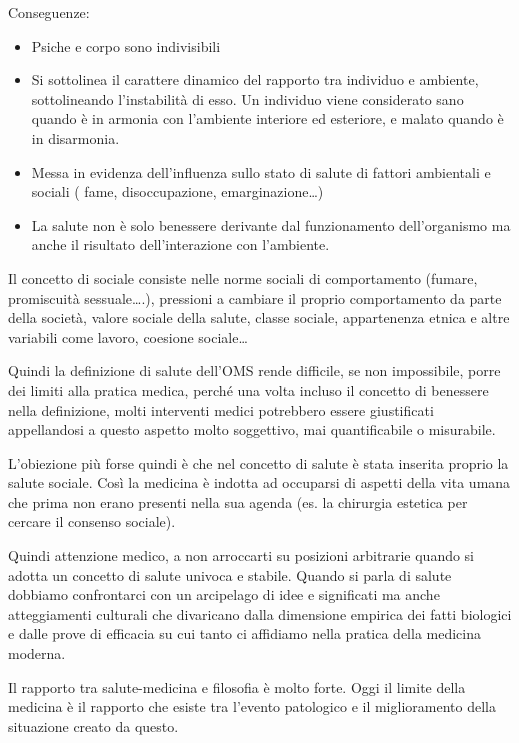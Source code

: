   Conseguenze:
\begin{itemize}
\item
  Psiche e corpo sono indivisibili
\item
  Si sottolinea il carattere dinamico del rapporto tra individuo e
  ambiente, sottolineando l'instabilità di esso. Un individuo viene
  considerato sano quando è in armonia con l'ambiente interiore ed
  esteriore, e malato quando è in disarmonia.
\item
  Messa in evidenza dell'influenza sullo stato di salute di fattori
  ambientali e sociali ( fame, disoccupazione, emarginazione\ldots{})
\item
  La salute non è solo benessere derivante dal funzionamento
  dell'organismo ma anche il risultato dell'interazione con l'ambiente.
\end{itemize}

  Il concetto di sociale consiste nelle norme sociali di comportamento
  (fumare, promiscuità sessuale\ldots{}.), pressioni a cambiare il
  proprio comportamento da parte della società, valore sociale della
  salute, classe sociale, appartenenza etnica e altre variabili come
  lavoro, coesione sociale\ldots{}

  Quindi la definizione di salute dell'OMS rende difficile, se non
  impossibile, porre dei limiti alla pratica medica, perché una volta
  incluso il concetto di benessere nella definizione, molti interventi
  medici potrebbero essere giustificati appellandosi a questo aspetto
  molto soggettivo, mai quantificabile o misurabile.

  L'obiezione più forse quindi è che nel concetto di salute è stata
  inserita proprio la salute sociale. Così la medicina è indotta ad
  occuparsi di aspetti della vita umana che prima non erano presenti
  nella sua agenda (es. la chirurgia estetica per cercare il consenso
  sociale).

  Quindi attenzione medico, a non arroccarti su posizioni arbitrarie
  quando si adotta un concetto di salute univoca e stabile. Quando si
  parla di salute dobbiamo confrontarci con un arcipelago di idee e
  significati ma anche atteggiamenti culturali che divaricano dalla
  dimensione empirica dei fatti biologici e dalle prove di efficacia su
  cui tanto ci affidiamo nella pratica della medicina moderna.

  Il rapporto tra salute-medicina e filosofia è molto forte. Oggi il
  limite della medicina è il rapporto che esiste tra l'evento patologico
  e il miglioramento della situazione creato da questo.

